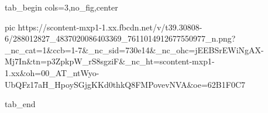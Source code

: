  
 
 
 
 


\ifcmt
  tab_begin cols=3,no_fig,center

     pic https://scontent-mxp1-1.xx.fbcdn.net/v/t39.30808-6/288012827_4837020086403369_7611014912677550977_n.png?_nc_cat=1&ccb=1-7&_nc_sid=730e14&_nc_ohc=jEEBSrEWiNgAX-Mj7In&tn=p3ZpkpW_rS8sgziF&_nc_ht=scontent-mxp1-1.xx&oh=00_AT_ntWyo-UbQFz17aH_HpoySGjgKKd0thkQ8FMPovevNVA&oe=62B1F0C7

  tab_end
\fi
